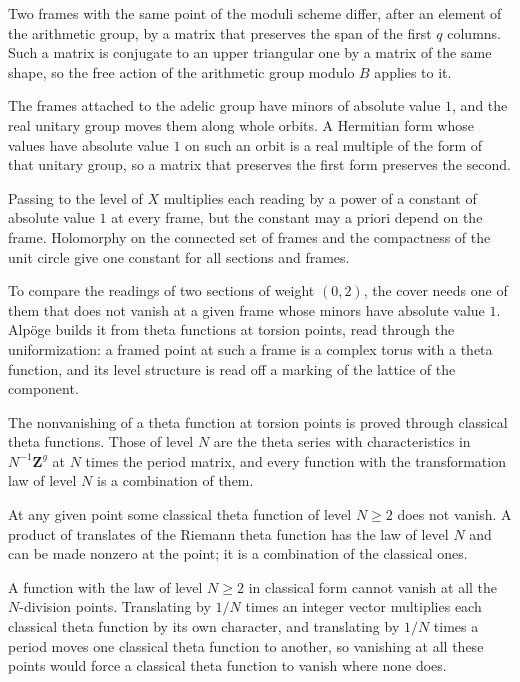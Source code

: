 Two frames with the same point of the moduli scheme differ, after an element of the arithmetic group, by
a matrix that preserves the span of the first $q$ columns. Such a matrix is conjugate to an upper triangular
one by a matrix of the same shape, so the free action of the arithmetic group modulo $B$ applies to it.

The frames attached to the adelic group have minors of absolute value $1$, and the real unitary group moves
them along whole orbits. A Hermitian form whose values have absolute value $1$ on such an orbit is a real
multiple of the form of that unitary group, so a matrix that preserves the first form preserves the second.

Passing to the level of $X$ multiplies each reading by a power of a constant of absolute value $1$ at every
frame, but the constant may a priori depend on the frame. Holomorphy on the connected set of frames and the
compactness of the unit circle give one constant for all sections and frames.

To compare the readings of two sections of weight $(0,2)$, the cover needs one of them that does not vanish at a
given frame whose minors have absolute value $1$. Alp\"oge builds it from theta functions at torsion points, read
through the uniformization: a framed point at such a frame is a complex torus with a theta function, and its level
structure is read off a marking of the lattice of the component.

The nonvanishing of a theta function at torsion points is proved through classical theta functions. Those of level
$N$ are the theta series with characteristics in $N^{-1}\mathbf Z^g$ at $N$ times the period matrix, and every
function with the transformation law of level $N$ is a combination of them.

At any given point some classical theta function of level $N\ge2$ does not vanish. A product of translates of the
Riemann theta function has the law of level $N$ and can be made nonzero at the point; it is a combination of the
classical ones.

A function with the law of level $N\ge2$ in classical form cannot vanish at all the $N$-division points. Translating
by $1/N$ times an integer vector multiplies each classical theta function by its own character, and translating by
$1/N$ times a period moves one classical theta function to another, so vanishing at all these points would force a
classical theta function to vanish where none does.


